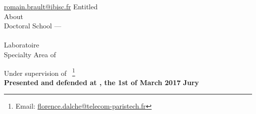 \begin{titlepage}
\begin{addmargin}[-1cm]{-3cm}
\begin{center}
{                \href{mailto:romain.brault@ibisc.fr}{romain.brault@ibisc.fr}}
            \endgroup
            \bigskip\vfill
            \begingroup
                Entitled \\ \smallskip {\Huge \color{PSaclay}\textsc{\myTitle}}
            \endgroup
            \bigskip
            \vfill
            \begingroup
                About \\ {\Large \textbf{\textsc{\mySubtitle}}}
            \endgroup
            \bigskip
            \vfill
            \begingroup
                Doctoral School --- \EDN\\
                \myDoctoralSchool\\
                Laboratoire \myFaculty\\
                Specialty Area of \myDepartment%
                \medskip
            \endgroup
        \end{center}
        \vspace{1cm}
        \vfill
        \noindent Under supervision of
        \mySupervisorDegree~\textsc{\mySupervisor}\footnote{Email:
        \href{mailto:florence.dalche@telecom-paristech.fr}%
        {florence.dalche@telecom-paristech.fr}}\\
        \smallskip
        \noindent \textbf{Presented and defended at \myUniUEVE, the 1st of
        March 2017}
        \smallskip
        \noindent \textbf{Jury}

\end{addmargin}
\end{titlepage}
